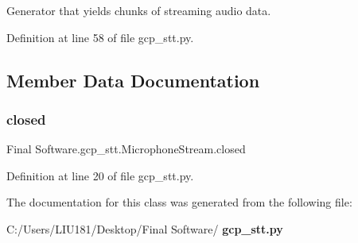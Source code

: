 Generator that yields chunks of streaming audio data. 



Definition at line 58 of file gcp\+\_\+stt.\+py.



\subsection{Member Data Documentation}
\mbox{\label{class_final_01_software_1_1gcp__stt_1_1_microphone_stream_a5f693e17e215cfc968f9a79b1a0ae3cf}} 
\subsubsection{closed}
{\footnotesize\ttfamily Final Software.\+gcp\+\_\+stt.\+Microphone\+Stream.\+closed}



Definition at line 20 of file gcp\+\_\+stt.\+py.



The documentation for this class was generated from the following file\+:\begin{DoxyCompactItemize}
\item 
C\+:/\+Users/\+L\+I\+U181/\+Desktop/\+Final Software/\textbf{ gcp\+\_\+stt.\+py}\end{DoxyCompactItemize}
